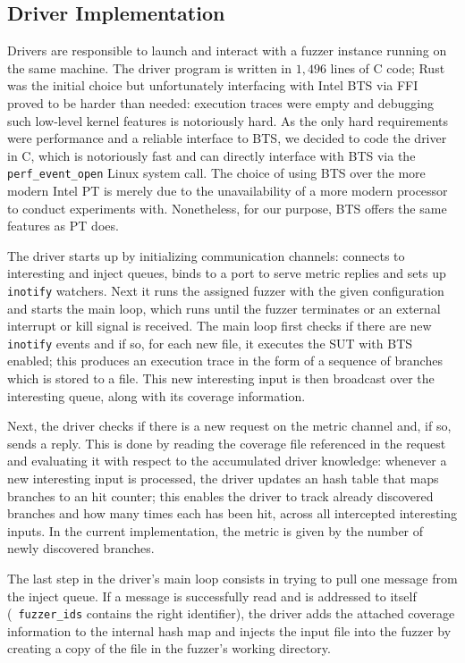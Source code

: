 \subsection{Driver Implementation}
\label{sec:driver-impl}

Drivers are responsible to launch and interact with a fuzzer instance running on
the same machine. The driver program is written in $1,496$ lines of C code; Rust
was the initial choice but unfortunately interfacing with Intel \ac{BTS} via
\ac{FFI} proved to be harder than needed: execution traces were empty and
debugging such low-level kernel features is notoriously hard. As the only hard
requirements were performance and a reliable interface to \ac{BTS}, we decided
to code the driver in C, which is notoriously fast and can directly interface
with \ac{BTS} via the \texttt{perf\_event\_open} Linux system call. The choice
of using \ac{BTS} over the more modern Intel \ac{PT} is merely due to the
unavailability of a more modern processor to conduct experiments with.
Nonetheless, for our purpose, \ac{BTS} offers the same features as \ac{PT} does.

The driver starts up by initializing communication channels: connects to
interesting and inject queues, binds to a port to serve metric replies and sets
up \texttt{inotify} watchers. Next it runs the assigned fuzzer with the given
configuration and starts the main loop, which runs until the fuzzer terminates
or an external interrupt or kill signal is received. The main loop first checks
if there are new \texttt{inotify} events and if so, for each new file, it
executes the \ac{SUT} with \ac{BTS} enabled; this produces an execution trace in
the form of a sequence of branches which is stored to a file. This new
interesting input is then broadcast over the interesting queue, along with its
coverage information.

Next, the driver checks if there is a new request on the metric channel and, if
so, sends a reply. This is done by reading the coverage file referenced in the
request and evaluating it with respect to the accumulated driver knowledge:
whenever a new interesting input is processed, the driver updates an hash table
that maps branches to an hit counter; this enables the driver to track already
discovered branches and how many times each has been hit, across all intercepted
interesting inputs. In the current implementation, the metric is given by the
number of newly discovered branches.

The last step in the driver's main loop consists in trying to pull one message
from the inject queue. If a message is successfully read and is addressed to
itself (\ie~\texttt{fuzzer\_ids} contains the right identifier), the driver adds
the attached coverage information to the internal hash map and injects the input
file into the fuzzer by creating a copy of the file in the fuzzer's working
directory.

